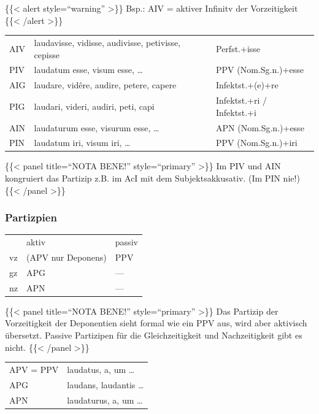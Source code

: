 \documentclass{scrartcl}
\begin{document}
\{\{< alert style="`warning"' >\}\} Bsp.: AIV = aktiver Infinitv der Vorzeitigkeit \{\{< /alert >\}\}


\begin{center}
\begin{tabular}{lll}
AIV & laudavisse, vidisse, audivisse, petivisse, cepisse & Perfst.+isse\\
PIV & laudatum esse, visum esse, \ldots{} & PPV (Nom.Sg.n.)+esse\\
AIG & laudare, vidêre, audire, petere, capere & Infektst.+(e)+re\\
PIG & laudari, videri, audiri, peti, capi & Infektst.+ri / Infektst.+i\\
AIN & laudaturum esse, visurum esse, \ldots{} & APN (Nom.Sg.n.)+esse\\
PIN & laudatum iri, visum iri, \ldots{} & PPV (Nom.Sg.n.)+iri\\
\end{tabular}
\end{center}


\{\{< panel title="`NOTA BENE!"' style="`primary"' >\}\} Im PIV und AIN kongruiert das Partizip z.B. im AcI mit dem Subjektsakkusativ. (Im PIN nie!) \{\{< /panel >\}\}



\subsubsection{Partizpien}
\label{sec:orgdb1a467}

\begin{center}
\begin{tabular}{lll}
 & aktiv & passiv\\
vz & (APV nur Deponens) & PPV\\
gz & APG & ---\\
nz & APN & ---\\
\end{tabular}
\end{center}

\{\{< panel title="`NOTA BENE!"' style="`primary"' >\}\} Das Partizip der Vorzeitigkeit der Deponentien sieht formal wie ein PPV aus, wird aber aktivisch übersetzt. Passive Partizipen für die Gleichzeitigkeit und Nachzeitigkeit gibt es nicht. \{\{< /panel >\}\}

\begin{center}
\begin{tabular}{ll}
APV = PPV & laudatus, a, um \ldots{}\\
APG & laudans, laudantis \ldots{}\\
APN & laudaturus, a, um \ldots{}\\
\end{tabular}
\end{center}
\end{document}
